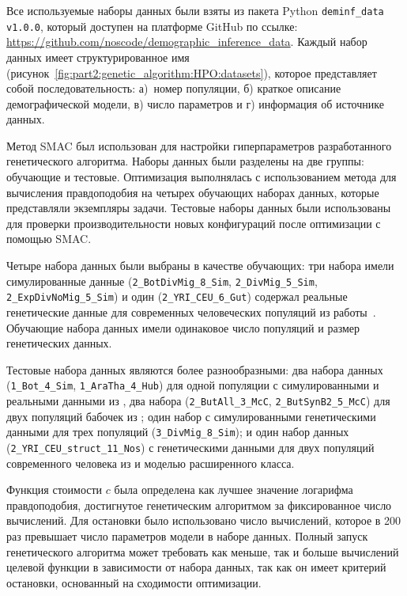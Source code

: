 Все используемые наборы данных были взяты из пакета Python \texttt{deminf\_data v1.0.0}, который доступен на платформе GitHub по ссылке: \url{https://github.com/noscode/demographic_inference_data}.
Каждый набор данных имеет структурированное имя (рисунок~\ref{fig:part2:genetic_algorithm:HPO:datasets}), которое представляет собой последовательность: а)~номер популяции, б) краткое описание демографической модели, в) число параметров и г) информация об источнике данных.

Метод SMAC был использован для настройки гиперпараметров разработанного генетического алгоритма.
Наборы данных были разделены на две группы: обучающие и тестовые.
Оптимизация выполнялась с использованием метода \moments для вычисления правдоподобия на четырех обучающих наборах данных, которые представляли экземпляры задачи.
Тестовые наборы данных были использованы для проверки производительности новых конфигураций после оптимизации с помощью SMAC.

Четыре набора данных были выбраны в качестве обучающих: три набора имели симулированные данные (\texttt{2\_BotDivMig\_8\_Sim}, \texttt{2\_DivMig\_5\_Sim}, \texttt{2\_ExpDivNoMig\_5\_Sim}) и один (\texttt{2\_YRI\_CEU\_6\_Gut}) содержал реальные генетические данные для современных человеческих популяций из работы~\cite{gutenkunst2009inferring}.
Обучающие набора данных имели одинаковое число популяций и размер генетических данных.

Тестовые набора данных являются более разнообразными: два набора данных (\texttt{1\_Bot\_4\_Sim}, \texttt{1\_AraTha\_4\_Hub}) для одной популяции с симулированными и реальными данными из \cite{huber2018gene},  два набора (\texttt{2\_ButAll\_3\_McC}, \texttt{2\_ButSynB2\_5\_McC}) для двух популяций бабочек из \cite{mccoy2014genomic}; один набор с симулированными генетическими данными для трех популяций (\texttt{3\_DivMig\_8\_Sim}); и один набор данных (\texttt{2\_YRI\_CEU\_struct\_11\_Nos}) с генетическими данными для двух популяций современного человека из \cite{gutenkunst2009inferring} и моделью расширенного класса.

Функция стоимости $c$ была определена как лучшее значение логарифма правдоподобия, достигнутое генетическим алгоритмом за фиксированное число вычислений.
Для остановки было использовано число вычислений, которое в 200 раз превышает число параметров модели в наборе данных.
Полный запуск генетического алгоритма может требовать как меньше, так и больше вычислений целевой функции в зависимости от набора данных, так как он имеет критерий остановки, основанный на сходимости оптимизации.

